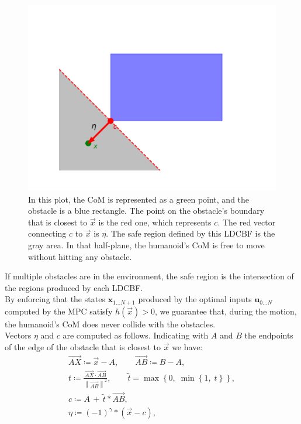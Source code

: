 \begin{figure}[h]
    \centering
    \includegraphics[width=0.75\linewidth]{figures//MPC/example_lcbf.pdf}
    \caption{In this plot, the CoM is represented as a green point, and the obstacle is a blue rectangle. The point on the obstacle's boundary that is closest to $\vec{x}$ is the red one, which represents $c$. The red vector connecting $c$ to $\vec{x}$ is $\eta$. The safe region defined by this LDCBF is the gray area. In that half-plane, the humanoid's CoM is free to move without hitting any obstacle.}
    \label{fig:example_LDCBF}
\end{figure}

If multiple obstacles are in the environment, the safe region is the intersection of the regions produced by each LDCBF.\\
By enforcing that the states $\mathbf{x}_{1...N+1}$ produced by the optimal inputs $\mathbf{u}_{0...N}$ computed by the MPC satisfy $h(\vec{x})>0$, we guarantee that, during the motion, the humanoid's CoM does never collide with the obstacles.\\

Vectors $\eta$ and $c$ are computed as follows. Indicating with $A$ and $B$ the endpoints of the edge of the obstacle that is closest to $\vec{x}$ we have:
\begin{gather*}
    \overrightarrow{AX} \coloneqq \vec{x} - A, \qquad \overrightarrow{AB} \coloneqq B - A, \\
    t \coloneqq \frac{\overrightarrow{AX} \cdot \overrightarrow{AB}}{\left\lVert \overrightarrow{AB} \right\rVert ^2}, \qquad \tilde{t} = \max \left\{0,\; \min \left\{ 1,\; t\right\}\right\}, \\
    c \coloneqq A\, +\, \tilde{t}*\overrightarrow{AB}, \\
    \eta \coloneqq \left(-1\right)^{\gamma} * \left( \vec{x} - c \right),
\end{gather*}

